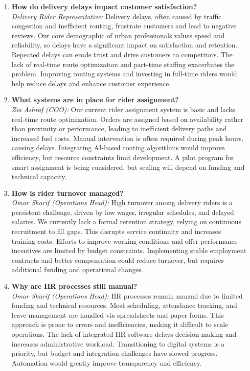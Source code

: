 \documentclass[12pt,a4paper]{article}
\begin{document}
\begin{enumerate}
        \item \textbf{How do delivery delays impact customer satisfaction?} \\
        \textit{Delivery Rider Representative:} Delivery delays, often caused by traffic congestion and inefficient routing, frustrate customers and lead to negative reviews. Our core demographic of urban professionals values speed and reliability, so delays have a significant impact on satisfaction and retention. Repeated delays can erode trust and drive customers to competitors. The lack of real-time route optimization and part-time staffing exacerbates the problem. Improving routing systems and investing in full-time riders would help reduce delays and enhance customer experience.

        \item \textbf{What systems are in place for rider assignment?} \\
        \textit{Zia Ashraf (COO):} Our current rider assignment system is basic and lacks real-time route optimization. Orders are assigned based on availability rather than proximity or performance, leading to inefficient delivery paths and increased fuel costs. Manual intervention is often required during peak hours, causing delays. Integrating AI-based routing algorithms would improve efficiency, but resource constraints limit development. A pilot program for smart assignment is being considered, but scaling will depend on funding and technical capacity.

        \item \textbf{How is rider turnover managed?} \\
        \textit{Omar Sharif (Operations Head):} High turnover among delivery riders is a persistent challenge, driven by low wages, irregular schedules, and delayed salaries. We currently lack a formal retention strategy, relying on continuous recruitment to fill gaps. This disrupts service continuity and increases training costs. Efforts to improve working conditions and offer performance incentives are limited by budget constraints. Implementing stable employment contracts and better compensation could reduce turnover, but requires additional funding and operational changes.

        \item \textbf{Why are HR processes still manual?} \\
        \textit{Omar Sharif (Operations Head):} HR processes remain manual due to limited funding and technical resources. Most scheduling, attendance tracking, and leave management are handled via spreadsheets and paper forms. This approach is prone to errors and inefficiencies, making it difficult to scale operations. The lack of integrated HR software delays decision-making and increases administrative workload. Transitioning to digital systems is a priority, but budget and integration challenges have slowed progress. Automation would greatly improve transparency and efficiency.


\end{enumerate}
\end{document}
